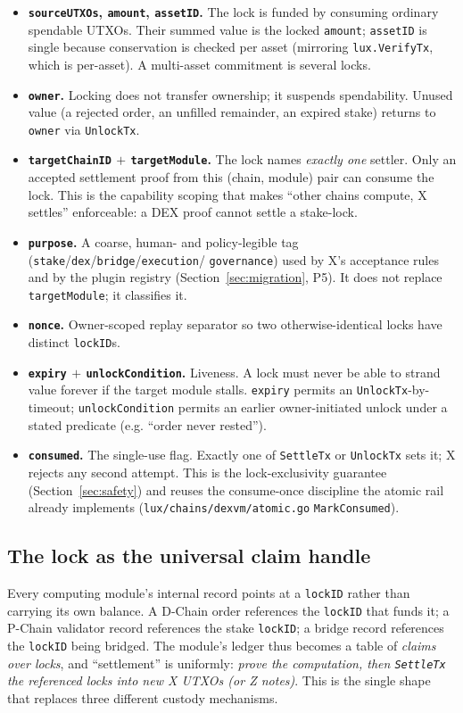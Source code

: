 \begin{itemize}[leftmargin=2em]
\item \textbf{\texttt{sourceUTXOs}, \texttt{amount}, \texttt{assetID}.}
  The lock is funded by consuming ordinary spendable UTXOs. Their summed
  value is the locked \texttt{amount}; \texttt{assetID} is single because
  conservation is checked per asset (mirroring \texttt{lux.VerifyTx},
  which is per-asset). A multi-asset commitment is several locks.
\item \textbf{\texttt{owner}.} Locking does not transfer ownership; it
  suspends spendability. Unused value (a rejected order, an unfilled
  remainder, an expired stake) returns to \texttt{owner} via
  \texttt{UnlockTx}.
\item \textbf{\texttt{targetChainID} $+$ \texttt{targetModule}.} The lock
  names \emph{exactly one} settler. Only an accepted settlement proof
  from this (chain, module) pair can consume the lock. This is the
  capability scoping that makes ``other chains compute, X settles''
  enforceable: a DEX proof cannot settle a stake-lock.
\item \textbf{\texttt{purpose}.} A coarse, human- and policy-legible tag
  (\texttt{stake}/\texttt{dex}/\texttt{bridge}/\texttt{execution}/
  \texttt{governance}) used by X's acceptance rules and by the plugin
  registry (Section~\ref{sec:migration}, P5). It does not replace
  \texttt{targetModule}; it classifies it.
\item \textbf{\texttt{nonce}.} Owner-scoped replay separator so two
  otherwise-identical locks have distinct \texttt{lockID}s.
\item \textbf{\texttt{expiry} $+$ \texttt{unlockCondition}.} Liveness.
  A lock must never be able to strand value forever if the target module
  stalls. \texttt{expiry} permits an \texttt{UnlockTx}-by-timeout;
  \texttt{unlockCondition} permits an earlier owner-initiated unlock
  under a stated predicate (e.g. ``order never rested'').
\item \textbf{\texttt{consumed}.} The single-use flag. Exactly one of
  \texttt{SettleTx} or \texttt{UnlockTx} sets it; X rejects any second
  attempt. This is the lock-exclusivity guarantee
  (Section~\ref{sec:safety}) and reuses the consume-once discipline the
  atomic rail already implements
  (\texttt{lux/chains/dexvm/atomic.go} \texttt{MarkConsumed}).
\end{itemize}

\subsection{The lock as the universal claim handle}

Every computing module's internal record points at a \texttt{lockID}
rather than carrying its own balance. A D-Chain order references the
\texttt{lockID} that funds it; a P-Chain validator record references the
stake \texttt{lockID}; a bridge record references the \texttt{lockID}
being bridged. The module's ledger thus becomes a table of
\emph{claims over locks}, and ``settlement'' is uniformly: \emph{prove
the computation, then \texttt{SettleTx} the referenced locks into new X
UTXOs (or Z notes)}. This is the single shape that replaces three
different custody mechanisms.
